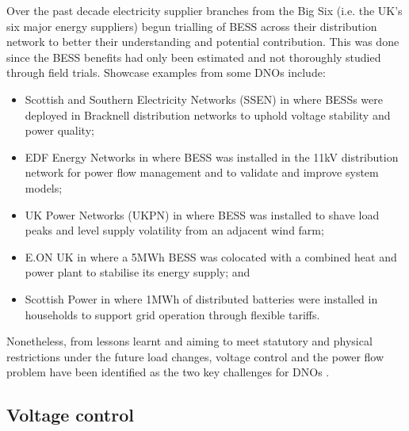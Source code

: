 Over the past decade electricity supplier branches from the Big Six (i.e. the UK's six major energy suppliers) begun trialling of BESS across their distribution network to better their understanding and potential contribution.
This was done since the BESS benefits had only been estimated and not thoroughly studied through field trials.
Showcase examples from some DNOs include:
\begin{itemize}
	\item Scottish and Southern Electricity Networks (SSEN) in \cite{NTVV2016} where BESSs were deployed in Bracknell distribution networks to uphold voltage stability and power quality;
	\item EDF Energy Networks in \cite{Wade2010} where BESS was installed in the 11kV distribution network for power flow management and to validate and improve system models;
	\item UK Power Networks (UKPN) in \cite{Lyons2015a} where BESS was installed to shave load peaks and level supply volatility from an adjacent wind farm;
\end{itemize}
\begin{itemize}
	\item E.ON UK in \cite{EON2017} where a 5MWh BESS was colocated with a combined heat and power plant to stabilise its energy supply; and
	\item Scottish Power in \cite{ScottishPower2016} where 1MWh of distributed batteries were installed in households to support grid operation through flexible tariffs.
\end{itemize}
Nonetheless, from lessons learnt and aiming to meet statutory and physical restrictions under the future load changes, voltage control and the power flow problem have been identified as the two key challenges for DNOs \cite{Ferreira2013a, Shi2015}.

\subsection{Voltage control}
\label{ch-literature:subsec:voltage-control}

